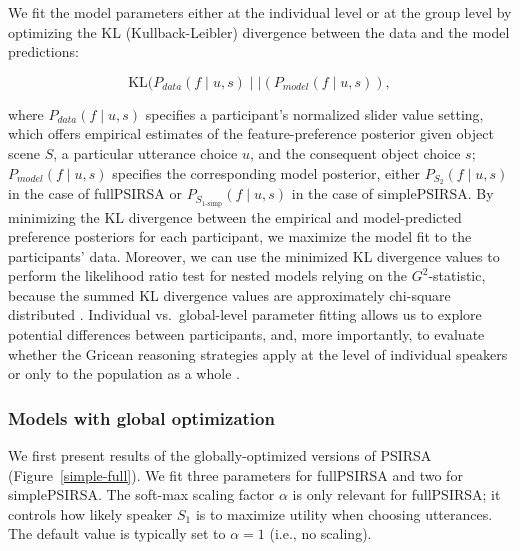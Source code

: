 \documentclass[10pt,a4paper]{article}
\begin{document}
We fit the model parameters either at the individual level or at the group level by optimizing the KL (Kullback-Leibler) divergence between the data and the model predictions:

$$\textrm{KL}(P_{data}(f \mid u,s)\mid\mid (P_{model}(f\mid u,s)),$$

\noindent where $P_{data}(f\mid u,s)$ specifies a participant's normalized slider value setting, which offers empirical estimates of the feature-preference posterior given object scene $S$, a particular utterance choice $u$, and the consequent object choice $s$;
$P_{model}(f\mid u,s)$ specifies the corresponding model posterior, either $P_{S_{2}}(f\mid u,s)$ in the case of fullPSIRSA or $P_{S_{1\textrm{-simp}}}(f\mid u,s)$ in the case of simplePSIRSA. 
By minimizing the KL divergence between the empirical and model-predicted preference posteriors for each participant, we maximize the model fit to the participants' data. 
Moreover, we can use the minimized KL divergence values to perform the likelihood ratio test for nested models relying on the $G^2$-statistic, because the summed KL divergence values are approximately chi-square distributed \cite{Lewandowsky:2011}. 
Individual vs.~global-level parameter fitting allows us to explore potential differences between participants, and, more importantly, to evaluate whether the Gricean reasoning strategies apply at the level of individual speakers or only to the population as a whole \cite{franke2016reasoning}. 


\subsubsection{Models with global optimization}

We first present results of the globally-optimized versions of  PSIRSA  (Figure~\ref{simple-full}).
We fit three parameters for fullPSIRSA and two for simplePSIRSA.
The soft-max scaling factor $\alpha$ is only relevant for fullPSIRSA; it  controls how likely speaker $S_1$ is to maximize utility when choosing utterances. 
The default value is typically set to $\alpha=1$ (i.e., no scaling). 
\end{document}
